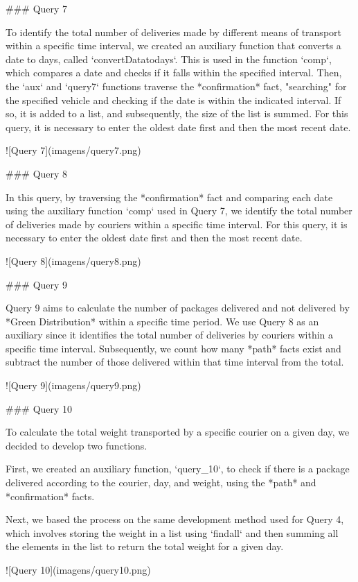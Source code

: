 ### Query 7

To identify the total number of deliveries made by different means of transport within a specific time interval, we created an auxiliary function that converts a date to days, called `convertDatatodays`. This is used in the function `comp`, which compares a date and checks if it falls within the specified interval. Then, the `aux` and `query7` functions traverse the *confirmation* fact, "searching" for the specified vehicle and checking if the date is within the indicated interval. If so, it is added to a list, and subsequently, the size of the list is summed. For this query, it is necessary to enter the oldest date first and then the most recent date.

![Query 7](imagens/query7.png)

### Query 8

In this query, by traversing the *confirmation* fact and comparing each date using the auxiliary function `comp` used in Query 7, we identify the total number of deliveries made by couriers within a specific time interval. For this query, it is necessary to enter the oldest date first and then the most recent date.

![Query 8](imagens/query8.png)

### Query 9

Query 9 aims to calculate the number of packages delivered and not delivered by *Green Distribution* within a specific time period. We use Query 8 as an auxiliary since it identifies the total number of deliveries by couriers within a specific time interval. Subsequently, we count how many *path* facts exist and subtract the number of those delivered within that time interval from the total.

![Query 9](imagens/query9.png)

### Query 10

To calculate the total weight transported by a specific courier on a given day, we decided to develop two functions.

First, we created an auxiliary function, `query_10`, to check if there is a package delivered according to the courier, day, and weight, using the *path* and *confirmation* facts.

Next, we based the process on the same development method used for Query 4, which involves storing the weight in a list using `findall` and then summing all the elements in the list to return the total weight for a given day.

![Query 10](imagens/query10.png)

